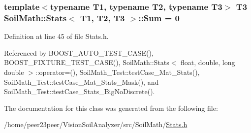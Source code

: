 \hypertarget{class_soil_math_1_1_stats_af326fa61048522fc146b799759e345f9}{}
\subsubsection[{Sum}]{\setlength{\rightskip}{0pt plus 5cm}template$<$typename T1, typename T2, typename T3$>$ T3 {\bf Soil\+Math\+::\+Stats}$<$ T1, T2, T3 $>$\+::Sum = 0}\label{class_soil_math_1_1_stats_af326fa61048522fc146b799759e345f9}


Definition at line 45 of file Stats.\+h.



Referenced by B\+O\+O\+S\+T\+\_\+\+A\+U\+T\+O\+\_\+\+T\+E\+S\+T\+\_\+\+C\+A\+S\+E(), B\+O\+O\+S\+T\+\_\+\+F\+I\+X\+T\+U\+R\+E\+\_\+\+T\+E\+S\+T\+\_\+\+C\+A\+S\+E(), Soil\+Math\+::\+Stats$<$ float, double, long double $>$\+::operator=(), Soil\+Math\+\_\+\+Test\+::test\+Case\+\_\+\+Mat\+\_\+\+Stats(), Soil\+Math\+\_\+\+Test\+::test\+Case\+\_\+\+Mat\+\_\+\+Stats\+\_\+\+Mask(), and Soil\+Math\+\_\+\+Test\+::test\+Case\+\_\+\+Stats\+\_\+\+Big\+No\+Discrete().



The documentation for this class was generated from the following file\+:\begin{DoxyCompactItemize}
\item 
/home/peer23peer/\+Vision\+Soil\+Analyzer/src/\+Soil\+Math/\hyperlink{_stats_8h}{Stats.\+h}\end{DoxyCompactItemize}
